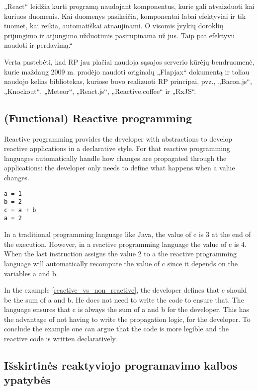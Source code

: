 „React“ leidžia kurti programą naudojant komponentus, kurie gali atvaizduoti kai kuriuos duomenis. Kai duomenys pasikeičia, komponentai labai efektyviai ir tik tuomet, kai reikia, automatiškai atnaujinami. O visomis įvykių doroklių prijungimo ir atjungimo užduotimis pasirūpinama už jus. Taip pat efektyvu naudoti ir perdavimą.“

Verta pastebėti, kad RP jau plačiai naudoja sąsajos serverio kūrėjų bendruomenė, kurie maždaug 2009 m. pradėjo naudoti originalų „Flapjax“ dokumentą ir toliau naudojo kelias bibliotekas, kuriose buvo realizuoti RP principai, pvz., „Bacon.js“, „Knockout“, „Meteor“, „React.js“, „Reactive.coffee“ ir „RxJS“.

\subsection{(Functional) Reactive programming}

Reactive programming provides the developer with abstractions to develop reactive applications in a declarative style. For that reactive programming languages automatically handle how changes are propagated through the applications: the developer only needs to define what happens when a value changes.

\begin{lstlisting}[caption=Programa demonstruojanti reaktyvaus ir imperatyvaus programavimo skirtumus, label=reactive_vs_non_reactive]
a = 1
b = 2
c = a + b
a = 2
\end{lstlisting}

In a traditional programming language like Java, the value of c is 3 at the end of the execution. However, in a reactive programming language the value of c is 4. When the last instruction assigns the value 2 to a the reactive programming language will automatically recompute the value of c since it depends on the variables a and b.

In the example \ref{reactive_vs_non_reactive}, the developer defines that c should be the sum of a and b. He does not need to write the code to ensure that. The language ensures that c is always the sum of a and b for the developer. This has the advantage of not having to write the propagation logic, for the developer. To conclude the example one can argue that the code is more legible and the reactive code is written declaratively.

\subsection{Išskirtinės reaktyviojo programavimo kalbos ypatybės}

